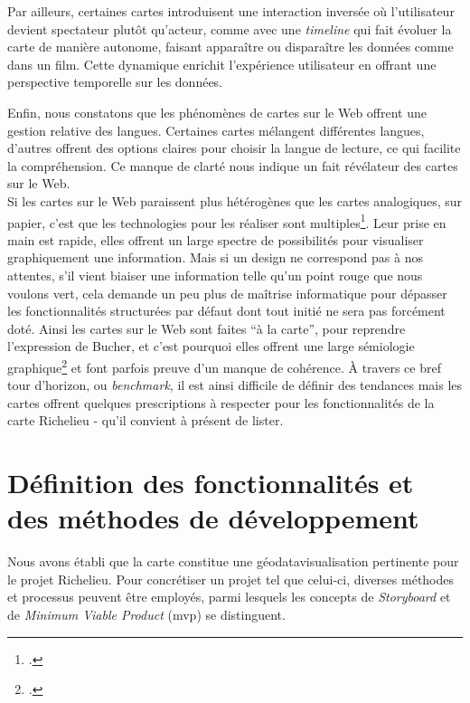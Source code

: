 Par ailleurs, certaines cartes introduisent une interaction inversée où l'utilisateur devient spectateur plutôt qu'acteur, comme avec une \textit{timeline} qui fait évoluer la carte de manière autonome, faisant apparaître ou disparaître les données comme dans un film. Cette dynamique enrichit l'expérience utilisateur en offrant une perspective temporelle sur les données.

Enfin, nous constatons que les phénomènes de cartes sur le Web offrent une gestion relative des langues. Certaines cartes mélangent différentes langues, d'autres offrent des options claires pour choisir la langue de lecture, ce qui facilite la compréhension. Ce manque de clarté nous indique un fait révélateur des cartes sur le Web. 
\\

Si les cartes sur le Web paraissent plus hétérogènes que les cartes analogiques, sur papier, c'est que les technologies pour les réaliser sont multiples\footcite{ARNAUDcarte2023}. Leur prise en main est rapide, elles offrent un large spectre de possibilités pour visualiser graphiquement une information. Mais si un design ne correspond pas à nos attentes, s'il vient biaiser une information telle qu'un point rouge que nous voulons vert, cela demande un peu plus de maîtrise informatique pour dépasser les fonctionnalités structurées par défaut dont tout initié ne sera pas forcément doté.  Ainsi les cartes sur le Web sont faites \enquote{à la carte}, pour reprendre l'expression de Bucher, et c'est pourquoi elles offrent une large sémiologie graphique\footcite{GEOCONFLUENCESSemiologie2024} et font parfois preuve d'un manque de cohérence. À travers ce bref tour d'horizon, ou \textit{benchmark}, il  est ainsi difficile de définir des tendances mais les cartes offrent quelques prescriptions à respecter pour les fonctionnalités de la carte Richelieu - qu'il convient à présent de lister. 

\section{Définition des fonctionnalités et des méthodes de développement}
Nous avons établi que la carte constitue une géodatavisualisation pertinente pour le projet Richelieu. Pour concrétiser un projet tel que celui-ci, diverses méthodes et processus peuvent être employés, parmi lesquels les concepts de \textit{Storyboard} et de \textit{Minimum Viable Product} (\acrshort{mvp}) se distinguent.

